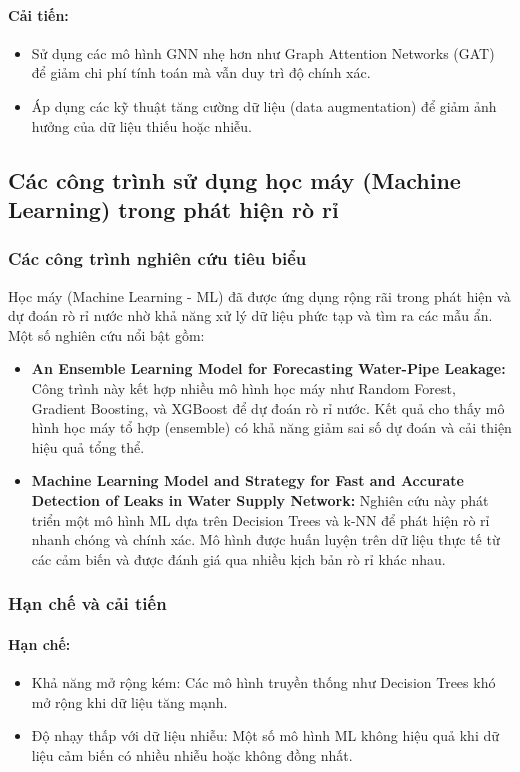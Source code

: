 \paragraph{Cải tiến:}
\begin{itemize}
    \item Sử dụng các mô hình GNN nhẹ hơn như Graph Attention Networks (GAT) để giảm chi phí tính toán mà vẫn duy trì độ chính xác.
    \item Áp dụng các kỹ thuật tăng cường dữ liệu (data augmentation) để giảm ảnh hưởng của dữ liệu thiếu hoặc nhiễu.
\end{itemize}

\subsection{Các công trình sử dụng học máy (Machine Learning) trong phát hiện rò rỉ}

\subsubsection*{Các công trình nghiên cứu tiêu biểu}
Học máy (Machine Learning - ML) đã được ứng dụng rộng rãi trong phát hiện và dự đoán rò rỉ nước nhờ khả năng xử lý dữ liệu phức tạp và tìm ra các mẫu ẩn. Một số nghiên cứu nổi bật gồm:

\begin{itemize}
    \item \textbf{An Ensemble Learning Model for Forecasting Water-Pipe Leakage:} Công trình này\cite{Warad2024} kết hợp nhiều mô hình học máy như Random Forest, Gradient Boosting, và XGBoost để dự đoán rò rỉ nước. Kết quả cho thấy mô hình học máy tổ hợp (ensemble) có khả năng giảm sai số dự đoán và cải thiện hiệu quả tổng thể.
    \item \textbf{Machine Learning Model and Strategy for Fast and Accurate Detection of Leaks in Water Supply Network:} Nghiên cứu này\cite{Fan2021} phát triển một mô hình ML dựa trên Decision Trees và k-NN để phát hiện rò rỉ nhanh chóng và chính xác. Mô hình được huấn luyện trên dữ liệu thực tế từ các cảm biến và được đánh giá qua nhiều kịch bản rò rỉ khác nhau.
\end{itemize}

\subsubsection*{Hạn chế và cải tiến}

\paragraph{Hạn chế:}
\begin{itemize}
    \item Khả năng mở rộng kém: Các mô hình truyền thống như Decision Trees khó mở rộng khi dữ liệu tăng mạnh.
    \item Độ nhạy thấp với dữ liệu nhiễu: Một số mô hình ML không hiệu quả khi dữ liệu cảm biến có nhiều nhiễu hoặc không đồng nhất.
\end{itemize}

